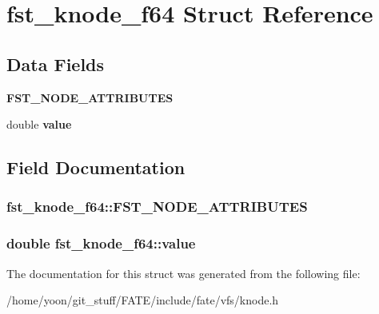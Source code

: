 \hypertarget{structfst__knode__f64}{\section{fst\-\_\-knode\-\_\-f64 Struct Reference}
\label{structfst__knode__f64}
}
\subsection*{Data Fields}
\begin{DoxyCompactItemize}
\item 
\hypertarget{structfst__knode__f64_a3837f5514de5b55c4a7fa37551e5448c}{{\bfseries F\-S\-T\-\_\-\-N\-O\-D\-E\-\_\-\-A\-T\-T\-R\-I\-B\-U\-T\-E\-S}}\label{structfst__knode__f64_a3837f5514de5b55c4a7fa37551e5448c}

\item 
\hypertarget{structfst__knode__f64_a28a0b2276f69aba33f6f8029a6c32971}{double {\bfseries value}}\label{structfst__knode__f64_a28a0b2276f69aba33f6f8029a6c32971}

\end{DoxyCompactItemize}


\subsection{Field Documentation}
\hypertarget{structfst__knode__f64_a3837f5514de5b55c4a7fa37551e5448c}{
\subsubsection[{F\-S\-T\-\_\-\-N\-O\-D\-E\-\_\-\-A\-T\-T\-R\-I\-B\-U\-T\-E\-S}]{\setlength{\rightskip}{0pt plus 5cm}fst\-\_\-knode\-\_\-f64\-::\-F\-S\-T\-\_\-\-N\-O\-D\-E\-\_\-\-A\-T\-T\-R\-I\-B\-U\-T\-E\-S}}\label{structfst__knode__f64_a3837f5514de5b55c4a7fa37551e5448c}
\hypertarget{structfst__knode__f64_a28a0b2276f69aba33f6f8029a6c32971}{
\subsubsection[{value}]{\setlength{\rightskip}{0pt plus 5cm}double fst\-\_\-knode\-\_\-f64\-::value}}\label{structfst__knode__f64_a28a0b2276f69aba33f6f8029a6c32971}


The documentation for this struct was generated from the following file\-:\begin{DoxyCompactItemize}
\item 
/home/yoon/git\-\_\-stuff/\-F\-A\-T\-E/include/fate/vfs/knode.\-h\end{DoxyCompactItemize}
